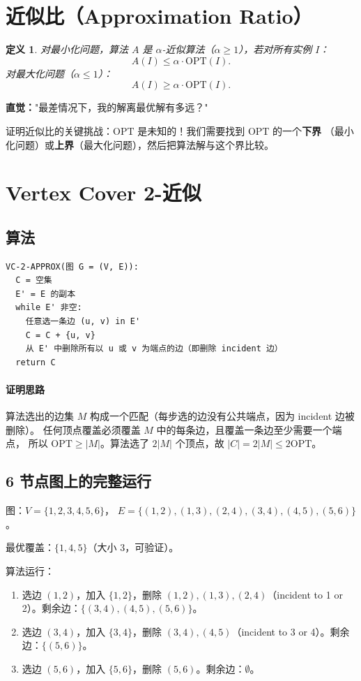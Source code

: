 \documentclass[UTF8,openany,12pt]{ctexbook}
\newtheorem{definition}{定义}[chapter]
\theoremstyle{remark}
\newcommand{\proofidea}[1]{\paragraph{证明思路}#1}
\newcommand{\OPT}{\mathrm{OPT}}
\begin{document}
\section{近似比（Approximation Ratio）}

\begin{definition}
对最小化问题，算法 $A$ 是 $\alpha$-近似算法（$\alpha \ge 1$），若对所有实例 $I$：
\[
  A(I) \le \alpha \cdot \OPT(I).
\]
对最大化问题（$\alpha \le 1$）：
\[
  A(I) \ge \alpha \cdot \OPT(I).
\]
\end{definition}

\textbf{直觉：}"最差情况下，我的解离最优解有多远？"

证明近似比的关键挑战：$\OPT$ 是未知的！我们需要找到 $\OPT$ 的一个\textbf{下界}
（最小化问题）或\textbf{上界}（最大化问题），然后把算法解与这个界比较。

\section{Vertex Cover 2-近似}

\subsection{算法}

\begin{lstlisting}[language={}]
VC-2-APPROX(图 G = (V, E)):
  C = 空集
  E' = E 的副本
  while E' 非空:
    任意选一条边 (u, v) in E'
    C = C + {u, v}
    从 E' 中删除所有以 u 或 v 为端点的边（即删除 incident 边）
  return C
\end{lstlisting}

\proofidea{
算法选出的边集 $M$ 构成一个匹配（每步选的边没有公共端点，因为 incident 边被删除）。
任何顶点覆盖必须覆盖 $M$ 中的每条边，且覆盖一条边至少需要一个端点，
所以 $\OPT \ge |M|$。算法选了 $2|M|$ 个顶点，故 $|C| = 2|M| \le 2\OPT$。
}

\subsection{6 节点图上的完整运行}

图：$V = \{1,2,3,4,5,6\}$，
$E = \{(1,2),(1,3),(2,4),(3,4),(4,5),(5,6)\}$。

最优覆盖：$\{1, 4, 5\}$（大小 3，可验证）。

算法运行：
\begin{enumerate}
  \item 选边 $(1,2)$，加入 $\{1,2\}$，删除 $(1,2),(1,3),(2,4)$（incident to 1 or 2）。剩余边：$\{(3,4),(4,5),(5,6)\}$。
  \item 选边 $(3,4)$，加入 $\{3,4\}$，删除 $(3,4),(4,5)$（incident to 3 or 4）。剩余边：$\{(5,6)\}$。
  \item 选边 $(5,6)$，加入 $\{5,6\}$，删除 $(5,6)$。剩余边：$\emptyset$。
\end{enumerate}
\end{document}

